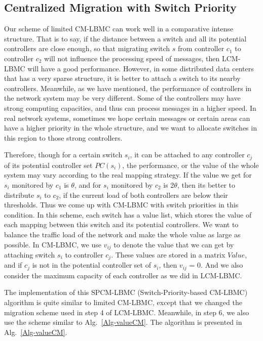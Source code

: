 \subsection{Centralized Migration with Switch Priority}

Our scheme of limited CM-LBMC can work well in a comparative intense structure. That is to say, if the distance between a switch and all its potential controllers are close enough, so that migrating switch $s$ from controller $c_1$ to controller $c_2$ will not influence the processing speed of messages, then LCM-LBMC will have a good performance. However, in some distributed data centers that has a very sparse structure, it is better to attach a switch to its nearby controllers. Meanwhile, as we have mentioned, the performance of controllers in the network system may be very different. Some of the controllers may have strong computing capacities, and thus can process messages in a higher speed. In real network systems, sometimes we hope certain messages or certain areas can have a higher priority in the whole structure, and we want to allocate switches in this region to those strong controllers.

Therefore, though for a certain switch $s_i$, it can be attached to any controller $c_j$ of its potential controller set $PC(s_i)$, the performance, or the value of the whole system may vary according to the real mapping strategy. If the value we get for $s_i$ monitored by $c_1$ is $\theta$, and for $s_i$ monitored by $c_2$ is 2$\theta$, then its better to distribute $s_i$ to $c_2$, if the current load of both controllers are below their thresholds. Thus we come up with CM-LBMC with switch priorities in this condition. In this scheme, each switch has a value list, which stores the value of each mapping between this switch and its potential controllers. We want to balance the traffic load of the network and make the whole value as large as possible. In CM-LBMC, we use $v_{ij}$ to denote the value that we can get by attaching switch $s_i$ to controller $c_j$. These values are stored in a matrix $Value$, and if $c_j$ is not in the potential controller set of $s_i$, then $v_{ij}$ = 0. And we also consider the maximum capacity of each controller as we did in LCM-LBMC.

The implementation of this SPCM-LBMC (Switch-Priority-based CM-LBMC) algorithm is quite similar to limited CM-LBMC, except that we changed the migration scheme used in step 4 of LCM-LBMC. Meanwhile, in step 6, we also use the scheme similar to Alg.~\ref{Alg-valueCM}. The algorithm is presented in Alg.~\ref{Alg-valueCM}.

